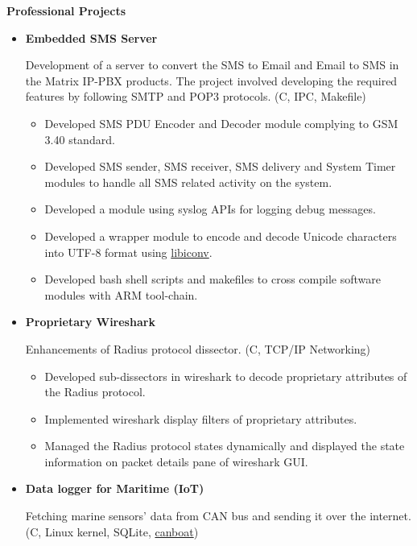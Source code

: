 \documentclass[letterpaper,11pt]{article}
\newcommand{\resitem}[1]{\item #1 \vspace{-2pt}}
\newcommand{\resheading}[1]{{\large \colorbox{mygrey}{\begin{minipage}{\textwidth}{\textbf{#1 \vphantom{p\^{E}}}}\end{minipage}}}}
\begin{document}
\resheading{Professional Projects}
\begin{itemize}
\item
    \textbf{Embedded SMS Server}
    
    Development of a server to convert the SMS to Email and Email to SMS in the Matrix IP-PBX products. The project involved developing the required features by following SMTP and POP3 protocols. (C, IPC, Makefile)

	\begin{itemize}
		\resitem{Developed SMS PDU Encoder and Decoder module complying to GSM 3.40 standard.}
		
		\resitem{Developed SMS sender, SMS receiver, SMS delivery and System Timer modules to handle all SMS related activity on the system.}
	  	
	  	\resitem{Developed a module using syslog APIs for logging debug messages.}

	    \resitem{Developed a wrapper module to encode and decode Unicode characters into UTF-8 format using \href{https://github.com/bnoordhuis/libiconv}{libiconv}.}
        
        \resitem{Developed bash shell scripts and makefiles to cross compile software modules with ARM tool-chain.}
		
	\end{itemize}
    
\item
    \textbf{Proprietary Wireshark}
    
    Enhancements of Radius protocol dissector. (C, TCP/IP Networking)
    
	\begin{itemize}
	    \resitem{Developed sub-dissectors in wireshark to decode proprietary attributes of the Radius protocol.}
	    \resitem{Implemented wireshark display filters of proprietary attributes.}
	    \resitem{Managed the Radius protocol states dynamically and displayed the state information on packet details pane of wireshark GUI.}
	   	\end{itemize}

\item
    \textbf{Data logger for Maritime (IoT)}
	
    Fetching marine sensors' data from CAN bus and sending it over the internet. (C, Linux kernel, SQLite, \href{https://github.com/mehul-m-prajapati/canboat}{canboat})
    

\end{itemize}
\end{document}

